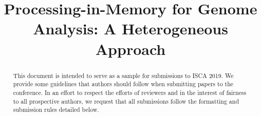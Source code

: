 \documentclass{sig-alternate}
\title{Processing-in-Memory for Genome Analysis: A Heterogeneous Approach}
\author{}
\begin{document}
\maketitle
\thispagestyle{firstpage}
\pagestyle{plain}

\begin{abstract}

This document is intended to serve as a sample for submissions to ISCA 2019. We provide some guidelines that authors should follow when submitting papers to the conference. In an effort to respect the efforts of reviewers and in the interest of fairness to all prospective authors, we request that all submissions follow the formatting and submission rules detailed below. 

\end{abstract}




\clearpage




\end{document}
